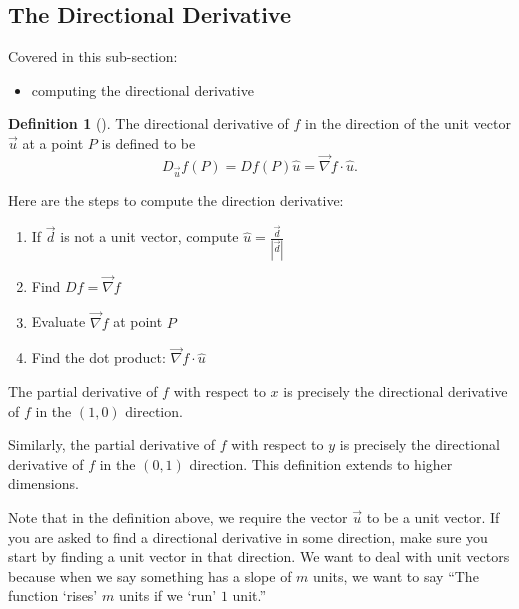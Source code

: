 \documentclass[10pt,]{book}
\theoremstyle{plain}
\theoremstyle{definition}
\newtheorem{definition}[theorem]{Definition}
\theoremstyle{definition}
\theoremstyle{definition}
\theoremstyle{definition}
\theoremstyle{definition}
\numberwithin{equation}{section}
\begin{document}
\subsection[{The Directional Derivative}]{The Directional Derivative}\label{subsection-34}
Covered in this sub-section: \leavevmode%
\begin{itemize}[label=\textbullet]
\item{}computing the directional derivative%
\end{itemize}
%
\begin{definition}[{}]\label{definition-38}
The directional derivative of \(f\) in the direction of the unit vector \(\vec u\) at a point \(P\) is defined to be%
\begin{equation*}
D_{\vec u} f(P) = Df(P) \hat u = \vec \nabla f \cdot \hat u.
\end{equation*}
%
\par
Here are the steps to compute the direction derivative: \leavevmode%
\begin{enumerate}
\item\hypertarget{li-156}{}If \(\vec{d}\) is not a unit vector, compute \(\hat{u}=\frac{\vec{d}}{|\vec{d}|}\)%
\item\hypertarget{li-157}{}Find \(Df=\vec{\nabla} f\)%
\item\hypertarget{li-158}{}Evaluate \(\vec{\nabla} f\) at point \(P\)%
\item\hypertarget{li-159}{}Find the dot product:  \(\vec \nabla f \cdot \hat u\)%
\end{enumerate}
%
\par
The partial derivative of \(f\) with respect to \(x\) is precisely the directional derivative of \(f\) in the \((1,0)\) direction.%
\par
Similarly, the partial derivative of \(f\) with respect to \(y\) is precisely the directional derivative of \(f\) in the \((0,1)\) direction. This definition extends to higher dimensions.%
\end{definition}
Note that in the definition above, we require the vector \(\vec u\) to be a unit vector. If you are asked to find a directional derivative in some direction, make sure you start by finding a unit vector in that direction. We want to deal with unit vectors because when we say something has a slope of \(m\) units, we want to say ``The function `rises' \(m\) units if we `run' \(1\) unit.''%
\end{document}
